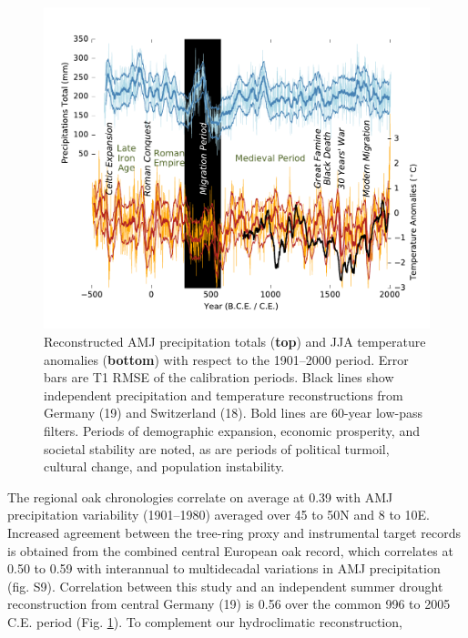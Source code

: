 \documentclass[10pt,a4paper,twoside,onecolumn]{article}
\begin{document}
\begin{myfont}
\begin{figure}[h]
\includegraphics[width=1\textwidth]{BuntgenFig4_1}
	\begin{multicols}{2}
\caption{Reconstructed AMJ precipitation totals (\textbf{top}) and JJA temperature anomalies (\textbf{bottom}) with respect to the 1901–2000 period. Error bars are T1 RMSE of the calibration periods. Black lines show independent precipitation and temperature reconstructions from Germany (19) and Switzerland (18). Bold lines are 60-year low-pass filters. Periods of demographic expansion, economic prosperity, and societal stability are noted, as are periods of political turmoil, cultural change, and population instability.}
	\end{multicols}	
\label{Fig4}
\end{figure}
	\begin{multicols}{3}
The regional oak chronologies correlate on average at 0.39 with AMJ precipitation variability (1901–1980) averaged over 45 to 50N and 8 to 10E. Increased agreement between the tree-ring proxy and instrumental target records is obtained from the combined central European oak record, which correlates at 0.50 to 0.59 with interannual to multidecadal variations in AMJ precipitation (fig. S9). Correlation between this study and an independent summer drought reconstruction from central Germany (19) is 0.56 over the common 996 to 2005 C.E. period (Fig. \ref{Fig4}). To complement our hydroclimatic reconstruction,

\end{multicols}
\end{myfont}
\end{document}
